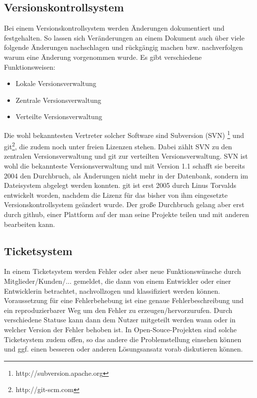 \subsection{Versionskontrollsystem}
Bei einem Versionskontrollsystem werden Änderungen dokumentiert und
festgehalten. So lassen sich Veränderungen an einem Dokument auch
über viele folgende Änderungen nachschlagen und rückgängig machen bzw.
nachverfolgen warum eine Änderung vorgenommen wurde.
Es gibt verschiedene Funktionsweisen:
\begin{itemize}
  \item Lokale Versionsverwaltung
  \item Zentrale Versionsverwaltung 
  \item Verteilte Versionsverwaltung 
\end{itemize}
Die wohl bekanntesten Vertreter solcher Software sind Subversion (SVN)
\footnote{http://subversion.apache.org} und git\footnote{http://git-scm.com}, die
zudem noch unter freien Lizenzen stehen.
Dabei zählt SVN zu den zentralen Versionsverwaltung und git zur 
verteilten Versionsverwaltung.
SVN ist wohl die bekannteste Versionsverwaltung und mit Version 1.1 schafft
sie bereits 2004 den Durchbruch, als Änderungen nicht mehr in der Datenbank, 
sondern im Dateisystem abgelegt werden konnten.
git ist erst 2005 durch Linus Torvalds entwickelt worden, nachdem die
Lizenz für das bisher von ihm eingesetzte Versionskontrollsystem geändert 
wurde. Der große Durchbruch gelang aber erst durch github, einer Plattform
auf der man seine Projekte teilen und mit anderen bearbeiten kann.

\subsection{Ticketsystem}
In einem Ticketsystem werden Fehler oder aber neue Funktionswünsche 
durch Mitglieder/Kunden/... gemeldet, die dann von einem Entwickler 
oder einer Entwicklerin betrachtet, nachvollzogen und klassifiziert
werden können. 
Voraussetzung für eine Fehlerbehebung ist eine genaue Fehlerbeschreibung 
und ein reproduzierbarer Weg um den Fehler zu erzeugen/hervorzurufen.
Durch verschiedene Statuse kann dann dem Nutzer mitgeteilt werden wann 
oder in welcher Version der Fehler behoben ist.
In Open-Souce-Projekten sind solche Ticketsystem zudem offen, so das 
andere die Problemstellung einsehen können und ggf. einen besseren
oder anderen Lösungsansatz vorab diskutieren können.

